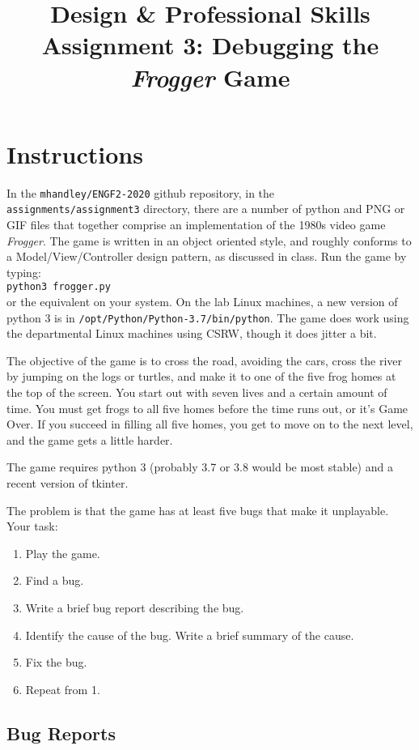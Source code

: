 \documentclass{article}
\title{Design \& Professional Skills\\
  Assignment 3: Debugging the {\em Frogger} Game}
\author{}
\date{}
\begin{document}
\maketitle

\section*{Instructions}

In the {\tt mhandley/ENGF2-2020} github repository, in the \\
{\tt assignments/assignment3} directory, there are a number of python and
PNG or GIF files that together comprise an implementation of the 1980s video
game \textit{Frogger}.  The game is written in an object oriented
style, and roughly conforms to a Model/View/Controller design pattern,
as discussed in class.  Run the game by typing:\\ \texttt{python3
  frogger.py}\\ or the equivalent on your system.  On the lab
Linux machines, a new version of python 3 is in
\texttt{/opt/Python/Python-3.7/bin/python}.  The game does work using
the departmental Linux machines using CSRW, though it does jitter a
bit.


The objective of the game is to cross the road, avoiding the cars,
cross the river by jumping on the logs or turtles, and make it to one
of the five frog homes at the top of the screen.  You start out with
seven lives and a certain amount of time.  You must get frogs to all
five homes before the time runs out, or it's Game Over.  If you
succeed in filling all five homes, you get to move on to the next
level, and the game gets a little harder.

The game requires python 3 (probably 3.7 or 3.8 would be most stable)
and a recent version of tkinter.

The problem is that the game has at least five bugs that make it unplayable.  Your task:
\begin{enumerate}
\item Play the game.
\item Find a bug.
\item Write a brief bug report describing the bug.
\item Identify the cause of the bug.  Write a brief summary of the cause.
\item Fix the bug.
\item Repeat from 1.
\end{enumerate}

\subsection*{Bug Reports}
\end{document}
